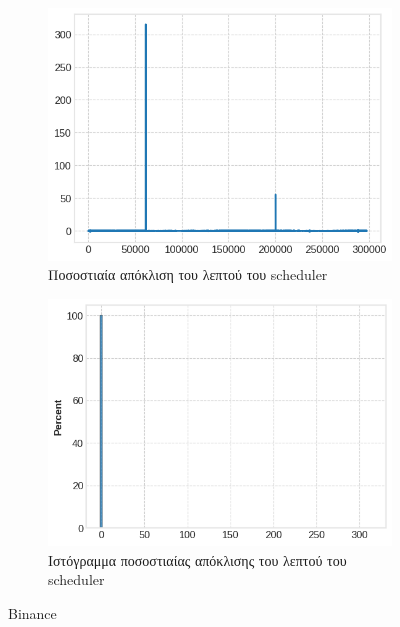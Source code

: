 \documentclass[12pt, a4paper]{article}
\begin{document}
\begin{figure}[h!]
  \begin{subfigure}[b]{0.45\textwidth}
    \centering
    \includegraphics[width=\textwidth]{delay_candlestick_line_binance.png}
    \caption{Ποσοστιαία απόκλιση του λεπτού του scheduler}
    \label{fig:sub3}
  \end{subfigure}
  \hfill
  \begin{subfigure}[b]{0.45\textwidth}
    \centering
    \includegraphics[width=\textwidth]{delay_candlestick_hist_binance.png}
    \caption{Ιστόγραμμα ποσοστιαίας απόκλισης του λεπτού του scheduler}
  \end{subfigure}
  
  \caption{Binance}
\end{figure}
\end{document}
